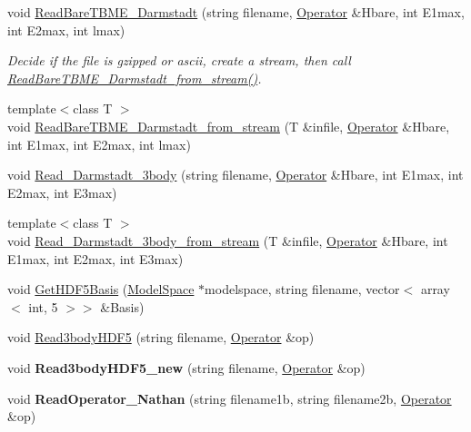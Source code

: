 \begin{DoxyCompactItemize}
\item 
void \hyperlink{classReadWrite_a7d1ea6782d893eab0217bb965fba990e}{Read\+Bare\+T\+B\+M\+E\+\_\+\+Darmstadt} (string filename, \hyperlink{classOperator}{Operator} \&Hbare, int E1max, int E2max, int lmax)\hypertarget{classReadWrite_a7d1ea6782d893eab0217bb965fba990e}{}\label{classReadWrite_a7d1ea6782d893eab0217bb965fba990e}

\begin{DoxyCompactList}\small\item\em Decide if the file is gzipped or ascii, create a stream, then call \hyperlink{classReadWrite_a44acf6835321a8bee6a795523728da2e}{Read\+Bare\+T\+B\+M\+E\+\_\+\+Darmstadt\+\_\+from\+\_\+stream()}. \end{DoxyCompactList}\item 
{\footnotesize template$<$class T $>$ }\\void \hyperlink{classReadWrite_a44acf6835321a8bee6a795523728da2e}{Read\+Bare\+T\+B\+M\+E\+\_\+\+Darmstadt\+\_\+from\+\_\+stream} (T \&infile, \hyperlink{classOperator}{Operator} \&Hbare, int E1max, int E2max, int lmax)
\item 
void \hyperlink{classReadWrite_a84c0cbaf2be415eadffb560ea0bb9785}{Read\+\_\+\+Darmstadt\+\_\+3body} (string filename, \hyperlink{classOperator}{Operator} \&Hbare, int E1max, int E2max, int E3max)
\item 
{\footnotesize template$<$class T $>$ }\\void \hyperlink{classReadWrite_af229332b05276f686966fdaaa98a81fd}{Read\+\_\+\+Darmstadt\+\_\+3body\+\_\+from\+\_\+stream} (T \&infile, \hyperlink{classOperator}{Operator} \&Hbare, int E1max, int E2max, int E3max)
\item 
void \hyperlink{classReadWrite_ad03f489c69c98d3ff1d33fbe9801c3d1}{Get\+H\+D\+F5\+Basis} (\hyperlink{classModelSpace}{Model\+Space} $\ast$modelspace, string filename, vector$<$ array$<$ int, 5 $>$$>$ \&Basis)
\item 
void \hyperlink{classReadWrite_a52656073ac0fa73c78dbd67c0f0e81e3}{Read3body\+H\+D\+F5} (string filename, \hyperlink{classOperator}{Operator} \&op)
\item 
void {\bfseries Read3body\+H\+D\+F5\+\_\+new} (string filename, \hyperlink{classOperator}{Operator} \&op)\hypertarget{classReadWrite_a524d4e87c842bbddc1c7ca9144a0e0da}{}\label{classReadWrite_a524d4e87c842bbddc1c7ca9144a0e0da}

\item 
void {\bfseries Read\+Operator\+\_\+\+Nathan} (string filename1b, string filename2b, \hyperlink{classOperator}{Operator} \&op)\hypertarget{classReadWrite_aba3deaad4a485577eb610db3da66bc79}{}\label{classReadWrite_aba3deaad4a485577eb610db3da66bc79}


\end{DoxyCompactItemize}
